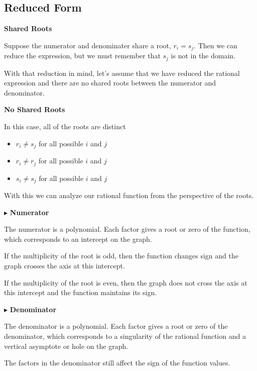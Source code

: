 \documentclass{ximera}
\begin{document}
\subsection*{Reduced Form}

\textbf{Shared Roots}

Suppose the numerator and denominater share a root, $r_i = s_j$.  Then we can reduce the expression, but we must remember that $s_j$ is not in the domain.


With that reduction in mind, let's assume that we have reduced the rational expression and there are no shared roots between the numerator and denominator. 




\textbf{No Shared Roots}

In this case, all of the roots are distinct

\begin{itemize}
\item $r_i \ne s_j$ for all possible $i$ and $j$
\item $r_i \ne r_j$ for all possible $i$ and $j$
\item $s_i \ne s_j$ for all possible $i$ and $j$
\end{itemize}


With this we can analyze our rational function from the perspective of the roots.



$\blacktriangleright$ \textbf{Numerator}



The numerator is a polynomial.  Each factor gives a root or zero of the function, which corresponds to an intercept on the graph. 

If the multiplicity of the root is odd, then the function changes sign and the graph crosses the axis at this intercept.  

If the multiplicity of the root is even, then the graph does not cross the axis at this intercept and the function maintains its sign. 






$\blacktriangleright$ \textbf{Denominator}


The denominator is a polynomial.  Each factor gives a root or zero of the denominator, which corresponds to a singularity of the rational function and a vertical asymptote or hole on the graph. 


The factors in the denominator still affect the sign of the function values.
\end{document}
